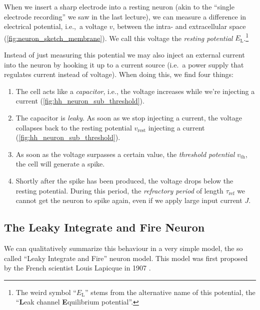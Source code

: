 \documentclass[10pt,letterpaper,oneside]{article}
\begin{document}
When we insert a sharp electrode into a resting neuron (akin to the \enquote{single electrode recording} we saw in the last lecture), we can measure a difference in electrical potential, i.e.,~a voltage $v$, between the intra- and extracellular space (\cref{fig:neuron_sketch_membrane}). We call this voltage the \emph{resting potential} $E_\mathrm{L}$.\footnote{The weird symbol \enquote{$E_\mathrm{L}$} stems from the alternative name of this potential, the \enquote{\textbf{L}eak channel \textbf{E}quilibrium potential}.}

Instead of just measuring this potential we may also inject an external current into the neuron by hooking it up to a current source (i.e.~a power supply that regulates current instead of voltage). When doing this, we find four things:
\begin{enumerate}
	\item The cell acts like a \emph{capacitor}, i.e., the voltage increases while we're injecting a current (\cref{fig:hh_neuron_sub_threshold}).
	\item The capacitor is \emph{leaky}. As soon as we stop injecting a current, the voltage collapses back to the resting potential $v_\mathrm{rest}$ injecting a current (\cref{fig:hh_neuron_sub_threshold}).
	\item As soon as the voltage surpasses a certain value, the \emph{threshold potential} $v_\mathrm{th}$, the cell will generate a spike.
	\item Shortly after the spike has been produced, the voltage drops below the resting potential. During this period, the \emph{refractory period} of length $\tau_\mathrm{ref}$ we cannot get the neuron to spike again, even if we apply large input current $J$.
\end{enumerate}


\subsection{The Leaky Integrate and Fire Neuron}

We can qualitatively summarize this behaviour in a very simple model, the so called \enquote{Leaky Integrate and Fire} neuron model. This model was first proposed by the French scientist Louis Lapicque in 1907 \cite{lapicque1907recherches,abbott1999lapicque}.
\end{document}
